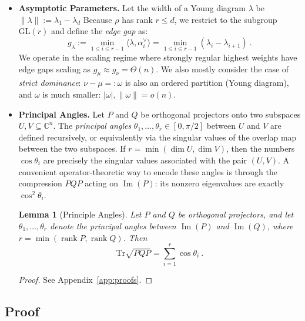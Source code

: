 \documentclass[a4paper,onecolumn,11pt]{quantumarticle}
\newtheorem{lem}{Lemma}
\newcommand*{\Tr}{\mathrm{Tr}}
\begin{document}
\begin{itemize}
\item\textbf{Asymptotic Parameters.}
Let the width of a Young diagram $\lambda$ be $\|\lambda\|:=\lambda_1-\lambda_d$ Because $\rho$ has rank $r \le d$, we restrict to the subgroup $\mathrm{GL}(r)$ and define the \emph{edge gap} as:
\begin{equation}
    g_\lambda := \min_{1\leq i\leq r-1}\langle \lambda, \alpha_i^\vee \rangle= \min_{1\leq i\leq r-1}(\lambda_i-\lambda_{i+1}) \ .
\end{equation}
We operate in the scaling regime where strongly regular highest weights have edge gaps scaling as $g_\mu \approx g_\nu = \Theta(n)$. We also mostly consider the case of \emph{strict dominance}: $\nu-\mu=:\omega$ is also an ordered partition (Young diagram), and $\omega$ is much smaller: $|\omega|, \|\omega\|=o(n)$.


\item\textbf{Principal Angles.}
Let $P$ and $Q$ be orthogonal projectors onto two subspaces $U,V \subseteq \mathbb{C}^n$. The \emph{principal angles} $\theta_1,\dots,\theta_r \in [0,\pi/2]$ between $U$ and $V$ are defined recursively, or equivalently via the singular values of the overlap map between the two subspaces. If $r=\min(\dim U,\dim V)$, then the numbers $\cos\theta_i$ are precisely the singular values associated with the pair $(U,V)$. A convenient operator-theoretic way to encode these angles is through the compression $PQP$ acting on $\operatorname{Im}(P)$: its nonzero eigenvalues are exactly $\cos^2\theta_i$.

\begin{lem}[Principle Angles]\label{lem:principle_angles}
Let $P$ and $Q$ be orthogonal projectors, and let $\theta_1,\dots,\theta_r$ denote the principal angles between $\operatorname{Im}(P)$ and $\operatorname{Im}(Q)$, where $r=\min(\operatorname{rank}P,\operatorname{rank}Q)$. Then
\begin{equation}
    \Tr \sqrt{PQP} = \sum_{i=1}^r \cos\theta_i \ .
\end{equation}
\end{lem}
\begin{proof}
    See Appendix~\ref{app:proofs}.
\end{proof}

\end{itemize}



\subsection{Proof}\label{sec:proof}
\end{document}
